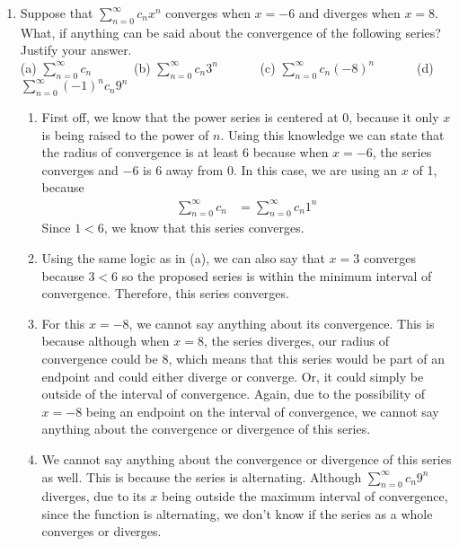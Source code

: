 \documentclass{article}
\begin{document}
\begin{enumerate}[label=\textbf{(13.\arabic*)}]

\newpage

\item Suppose that $\displaystyle \sum_{n=0}^\infty c_n x^n$ converges when $x=-6$ and diverges when $x=8$. What, if anything can be said about the convergence of the following series? Justify your answer.\\
(a) $\displaystyle \sum_{n=0}^\infty c_n\quad\quad\quad$ (b) $\displaystyle \sum_{n=0}^\infty c_n3^n\quad\quad\quad$ (c) $\displaystyle \sum_{n=0}^\infty c_n(-8)^n\quad\quad\quad$ (d) $\displaystyle \sum_{n=0}^\infty (-1)^nc_n9^n$

\begin{enumerate}
\item First off, we know that the power series is centered at 0, because it only $x$ is being raised to the power of $n$. Using this knowledge we can state that the radius of convergence is at least 6 because when $x=-6$, the series converges and $-6$ is 6 away from 0. In this case, we are using an $x$ of 1, because
\begin{align*}
\sum_{n=0}^\infty c_n &= \sum_{n=0}^\infty c_n1^n
\end{align*}
Since $1<6$, we know that this series converges.
\item Using the same logic as in (a), we can also say that $x=3$ converges because $3<6$ so the proposed series is within the minimum interval of convergence. Therefore, this series converges.
\item For this $x=-8$, we cannot say anything about its convergence. This is because although when $x=8$, the series diverges, our radius of convergence could be 8, which means that this series would be part of an endpoint and could either diverge or converge. Or, it could simply be outside of the interval of convergence. Again, due to the possibility of $x=-8$ being an endpoint on the interval of convergence, we cannot say anything about the convergence or divergence of this series. 
\item We cannot say anything about the convergence or divergence of this series as well. This is because the series is alternating. Although $\displaystyle \sum_{n=0}^\infty c_n9^n$ diverges, due to its $x$ being outside the maximum interval of convergence, since the function is alternating, we don't know if the series as a whole converges or diverges.
\end{enumerate}



\end{enumerate}
\end{document}

